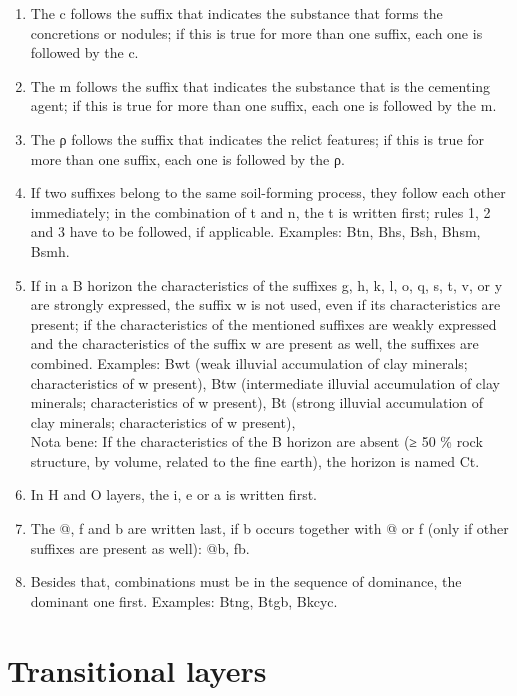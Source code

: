\documentclass[
  letterpaper,
  DIV=11,
  numbers=noendperiod]{scrreprt}
\begin{document}
\begin{enumerate}
\def\labelenumi{\arabic{enumi}.}
\item
  The c follows the suffix that indicates the substance that forms the
  concretions or nodules; if this is true for more than one suffix, each
  one is followed by the c.
\item
  The m follows the suffix that indicates the substance that is the
  cementing agent; if this is true for more than one suffix, each one is
  followed by the m.
\item
  The ρ follows the suffix that indicates the relict features; if this
  is true for more than one suffix, each one is followed by the ρ.
\item
  If two suffixes belong to the same soil-forming process, they follow
  each other immediately; in the combination of t and n, the t is
  written first; rules 1, 2 and 3 have to be followed, if applicable.
  Examples: Btn, Bhs, Bsh, Bhsm, Bsmh.
\item
  If in a B horizon the characteristics of the suffixes g, h, k, l, o,
  q, s, t, v, or y are strongly expressed, the suffix w is not used,
  even if its characteristics are present; if the characteristics of the
  mentioned suffixes are weakly expressed and the characteristics of the
  suffix w are present as well, the suffixes are combined. Examples: Bwt
  (weak illuvial accumulation of clay minerals; characteristics of w
  present), Btw (intermediate illuvial accumulation of clay minerals;
  characteristics of w present), Bt (strong illuvial accumulation of
  clay minerals; characteristics of w present),\\
  Nota bene: If the characteristics of the B horizon are absent (≥ 50 \%
  rock structure, by volume, related to the fine earth), the horizon is
  named Ct.
\item
  In H and O layers, the i, e or a is written first.
\item
  The @, f and b are written last, if b occurs together with @ or f
  (only if other suffixes are present as well): @b, fb.
\item
  Besides that, combinations must be in the sequence of dominance, the
  dominant one first. Examples: Btng, Btgb, Bkcyc.
\end{enumerate}

\hypertarget{transitional-layers}{%
\section{Transitional layers}\label{transitional-layers}}
\end{document}
